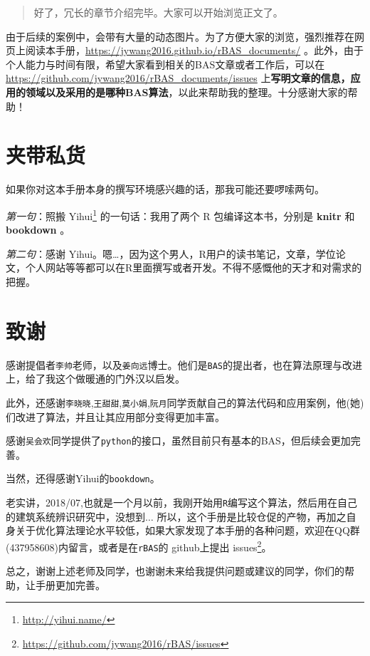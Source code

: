 \documentclass[]{ctexbook}
\renewcommand{\href}[2]{#2\footnote{\url{#1}}}
\begin{document}
\begin{quote}
好了，冗长的章节介绍完毕。大家可以开始浏览正文了。
\end{quote}

由于后续的案例中，会带有大量的动态图片。为了方便大家的浏览，强烈推荐在网页上阅读本手册，\url{https://jywang2016.github.io/rBAS_documents/}
。此外，由于个人能力与时间有限，希望大家看到相关的BAS文章或者工作后，可以在
\url{https://github.com/jywang2016/rBAS_documents/issues}
上\textbf{写明文章的信息，应用的领域以及采用的是哪种BAS算法}，以此来帮助我的整理。十分感谢大家的帮助！

\section*{夹带私货}


如果你对这本手册本身的撰写环境感兴趣的话，那我可能还要啰嗦两句。

\emph{第一句}：照搬 \href{http://yihui.name/}{Yihui}
的一句话：我用了两个 R 包编译这本书，分别是 \textbf{knitr}
\citep{xie2015} 和 \textbf{bookdown}
\citep{R-bookdown}。

\emph{第二句}：感谢
Yihui。嗯\ldots{}，因为这个男人，R用户的读书笔记，文章，学位论文，个人网站等等都可以在R里面撰写或者开发。不得不感慨他的天才和对需求的把握。

\section*{致谢}


感谢提倡者\texttt{李帅}老师，以及\texttt{姜向远}博士。他们是\texttt{BAS}的提出者，也在算法原理与改进上，给了我这个做暖通的门外汉以启发。

此外，还感谢\texttt{李晓晓},\texttt{王甜甜},\texttt{莫小娟},\texttt{阮月}同学贡献自己的算法代码和应用案例，他(她)们改进了算法，并且让其应用部分变得更加丰富。

感谢\texttt{吴会欢}同学提供了\texttt{python}的接口，虽然目前只有基本的BAS，但后续会更加完善。

当然，还得感谢Yihui的\texttt{bookdown}。

老实讲，2018/07,也就是一个月以前，我刚开始用\texttt{R}编写这个算法，然后用在自己的建筑系统辨识研究中，没想到\(\dots\)
所以，这个手册是比较仓促的产物，再加之自身关于优化算法理论水平较低，如果大家发现了本手册的各种问题，欢迎在QQ群(437958608)内留言，或者是在\texttt{rBAS}的
github上提出 \href{https://github.com/jywang2016/rBAS/issues}{issues}。

总之，谢谢上述老师及同学，也谢谢未来给我提供问题或建议的同学，你们的帮助，让手册更加完善。
\end{document}
